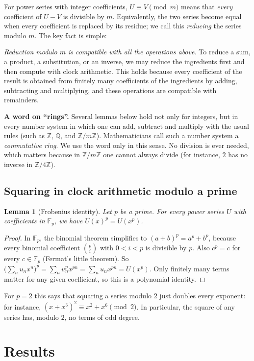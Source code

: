 \documentclass[11pt,a4paper]{article}
\newtheorem{lemma}[theorem]{Lemma}
\theoremstyle{definition}
\theoremstyle{remark}
\newcommand{\Z}{\mathbb{Z}}
\newcommand{\Q}{\mathbb{Q}}
\newcommand{\F}{\mathbb{F}}
\newcommand{\para}[1]{\par\medskip\noindent\textbf{#1}\enspace}
\begin{document}
For power series with integer coefficients, $U\equiv V\pmod m$ means that \emph{every} coefficient of $U-V$ is
divisible by $m$. Equivalently, the two series become equal when every coefficient is replaced by its residue; we call
this \emph{reducing} the series modulo $m$. The key fact is simple:

\emph{Reduction modulo $m$ is compatible with all the operations above.} To reduce a sum, a product, a substitution, or
an inverse, we may reduce the ingredients first and then compute with clock arithmetic. This holds because every
coefficient of the result is obtained from finitely many coefficients of the ingredients by adding, subtracting and
multiplying, and these operations are compatible with remainders.

\para{A word on ``rings''.} Several lemmas below hold not only for integers, but in every number system in
which one can add, subtract and multiply with the usual rules (such as $\Z$, $\Q$, and $\Z/m\Z$). Mathematicians call
such a number system a \emph{commutative ring}. We use the word only in this sense. No division is ever needed, which
matters because in $\Z/m\Z$ one cannot always divide (for instance, $2$ has no inverse in $\Z/4\Z$).

\subsection{Squaring in clock arithmetic modulo a prime}
\begin{lemma}[Frobenius identity]\label{lem:frobenius}
Let $p$ be a prime. For every power series $U$ with coefficients in $\F_p$, we have $U(x)^p=U(x^p)$.
\end{lemma}

\begin{proof}
In $\F_p$, the binomial theorem simplifies to $(a+b)^p=a^p+b^p$, because every binomial coefficient
$\binom pi$ with $0<i<p$ is divisible by $p$. Also $c^p=c$ for every $c\in\F_p$ (Fermat's little theorem). So
$\bigl(\sum_nu_nx^n\bigr)^p=\sum_nu_n^px^{pn}=\sum_nu_nx^{pn}=U(x^p)$. Only finitely many terms matter for any given
coefficient, so this is a polynomial identity.
\end{proof}

For $p=2$ this says that squaring a series modulo $2$ just doubles every exponent: for instance,
$(x+x^3)^2\equiv x^2+x^6\pmod2$. In particular, the square of any series has, modulo $2$, no terms of odd degree.


\section{Results}\label{sec:results}
\end{document}
